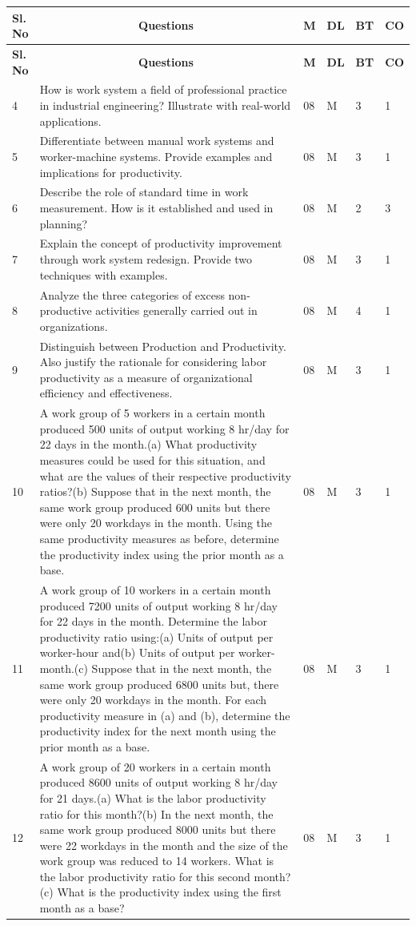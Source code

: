 \documentclass{rvcepaper}
\newenvironment{qbtable}{%
  \begin{longtable}{|C{1.05cm}|p{10.7cm}|C{0.85cm}|C{0.95cm}|C{0.85cm}|C{0.85cm}|}
  \hline \textbf{Sl.\newline No} & \multicolumn{1}{c|}{\textbf{Questions}} & \textbf{M} & \textbf{DL} & \textbf{BT} & \textbf{CO}\\ \hline
  \endfirsthead
  \hline \textbf{Sl.\newline No} & \multicolumn{1}{c|}{\textbf{Questions}} & \textbf{M} & \textbf{DL} & \textbf{BT} & \textbf{CO}\\ \hline
  \endhead
}{\end{longtable}}
\newcommand{\qbrow}[6]{#1 & #2 & #3 & #4 & #5 & #6\\ \hline}
\begin{document}
\begin{iempaper}
\begin{qbtable}
\qbrow{4}{How is work system a field of professional practice in industrial engineering? Illustrate with real-world applications.}{08}{M}{3}{1}
\qbrow{5}{Differentiate between manual work systems and worker-machine systems. Provide examples and implications for productivity.}{08}{M}{3}{1}
\qbrow{6}{Describe the role of standard time in work measurement. How is it established and used in planning?}{08}{M}{2}{3}
\qbrow{7}{Explain the concept of productivity improvement through work system redesign. Provide two techniques with examples.}{08}{M}{3}{1}
\qbrow{8}{Analyze the three categories of excess non-productive activities generally carried out in organizations.}{08}{M}{4}{1}
\qbrow{9}{Distinguish between Production and Productivity. Also justify the rationale for considering labor productivity as a measure of organizational efficiency and effectiveness.}{08}{M}{3}{1}
\qbrow{10}{A work group of 5 workers in a certain month produced 500 units of output working 8 hr/day for 22 days in the month.\newline (a) What productivity measures could be used for this situation, and what are the values of their respective productivity ratios?\newline (b) Suppose that in the next month, the same work group produced 600 units but there were only 20 workdays in the month. Using the same productivity measures as before, determine the productivity index using the prior month as a base.}{08}{M}{3}{1}
\qbrow{11}{A work group of 10 workers in a certain month produced 7200 units of output working 8 hr/day for 22 days in the month. Determine the labor productivity ratio using:\newline (a) Units of output per worker-hour and\newline (b) Units of output per worker-month.\newline (c) Suppose that in the next month, the same work group produced 6800 units but, there were only 20 workdays in the month. For each productivity measure in (a) and (b), determine the productivity index for the next month using the prior month as a base.}{08}{M}{3}{1}
\qbrow{12}{A work group of 20 workers in a certain month produced 8600 units of output working 8 hr/day for 21 days.\newline (a) What is the labor productivity ratio for this month?\newline (b) In the next month, the same work group produced 8000 units but there were 22 workdays in the month and the size of the work group was reduced to 14 workers. What is the labor productivity ratio for this second month?\newline (c) What is the productivity index using the first month as a base?}{08}{M}{3}{1}

\end{qbtable}
\end{iempaper}
\end{document}
